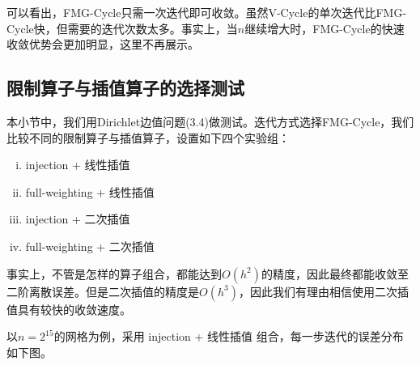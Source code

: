 \documentclass[lang=cn,10pt]{elegantbook}
\begin{document}
可以看出，FMG-Cycle只需一次迭代即可收敛。虽然V-Cycle的单次迭代比FMG-Cycle快，但需要的迭代次数太多。事实上，当$n$继续增大时，FMG-Cycle的快速收敛优势会更加明显，这里不再展示。

\subsection{限制算子与插值算子的选择测试}

本小节中，我们用Dirichlet边值问题(3.4)做测试。迭代方式选择FMG-Cycle，我们比较不同的限制算子与插值算子，设置如下四个实验组：
\begin{enumerate}[(i)]
  \item injection + 线性插值
  \item full-weighting + 线性插值
  \item injection + 二次插值
  \item full-weighting + 二次插值
\end{enumerate}

事实上，不管是怎样的算子组合，都能达到$O(h^2)$的精度，因此最终都能收敛至二阶离散误差。但是二次插值的精度是$O(h^3)$，因此我们有理由相信使用二次插值具有较快的收敛速度。

以$n=2^{15}$的网格为例，采用 injection + 线性插值 组合，每一步迭代的误差分布如下图。
\end{document}
